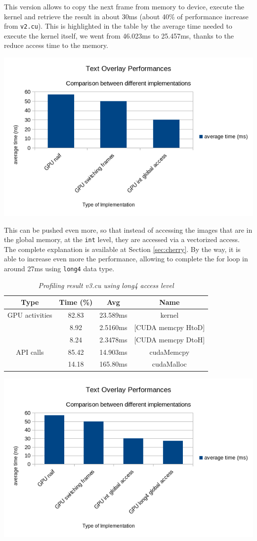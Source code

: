 \documentclass[paper=a4, fontsize=10pt]{scrartcl}	%
\begin{document}
	This version allows to copy the next frame from memory to device, execute the kernel and retrieve the result in about 30ms (about 40\% of performance increase from \texttt{v2.cu}). This is highlighted in the table by the average time needed to execute the kernel itself, we went from 46.023ms to 25.457ms, thanks to the reduce access time to the memory.
	
	\begin{center}
		\includegraphics[width=0.6\linewidth]{images/heatmap/comp_heat_4}
	\end{center}
	
	This can be pushed even more, so that instead of accessing the images that are in the global memory, at the \texttt{int} level, they are accessed via a vectorized access. The complete explanation is available at Section \ref{sec:cherry}. By the way, it is able to increase even more the performance, allowing to complete the for loop in around 27ms using \texttt{long4} data type.
		\begin{table}[H]
		\centering
		\begin{center}
			\begin{tabular}{ |c|c|c|c| } 
				\hline
				\textbf{Type} & \textbf{Time} (\%) & \textbf{Avg} & \textbf{Name} \\ 
				\hline
				GPU activities & 82.83 & 23.589ms & kernel \\ 
				& 8.92 & 2.5160ms & [CUDA memcpy HtoD] \\ 
				& 8.24 & 2.3478ms & [CUDA memcpy DtoH] \\ 
				\hline
				API calls & 85.42 & 14.903ms & cudaMemcpy \\ 
				& 14.18 & 165.80ms & cudaMalloc \\ 
				\hline
			\end{tabular}
		\end{center}
		\label{fig:table_v5}
		\caption{\textit{Profiling result v3.cu using long4 access level}}
	\end{table}
	\begin{center}
		\includegraphics[width=0.6\linewidth]{images/heatmap/comp_heat_5}
	\end{center}
	
\end{document}
